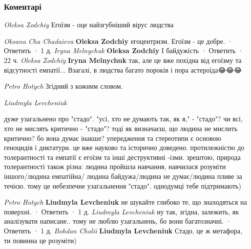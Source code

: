  
 
 
 
 
\subsubsection{Коментарі}

\begin{itemize}
\emph{Oleksa Zodchiy}
Егоїзм - оце найзгубніший вірус людства

\begin{itemize}
\emph{Oksana Cha Chadaieva}
\textbf{Oleksa Zodchiy} егоцентризм. Егоїзм - це добре.
 · Ответить · 1 д.
\emph{Iryna Melnychuk}
\textbf{Oleksa Zodchiy}
І байдужість
 · Ответить · 22 ч.
\emph{Oleksa Zodchiy}
\textbf{Iryna Melnychuk} так, але це вже похідна від егоїзму та відсутності емпатії... Взагалі, в людства багато пороків і пора астероїда😂😂😂
\end{itemize}

\emph{Petro Hotych}
Згідний з кожним словом.

\emph{Liudmyla Levcheniuk}

дуже узагальнено про "стадо". "усі, хто не думають так, як я," - "стадо"? чи
всі, хто не мислять критично - "стадо"? тоді як визначаєш, що людина не мислить
критично? бо вона думає інакше? упередження та стереотипи є основою геноцидів і
диктатури. це вже науково та історично доведено. протилежністю до толерантності
та емпатії є егоїзм та інші деструктивні -ізми. зрештою, природа толерантності
також різна: людина пройшла навчання, навчилася розуміти іншого/людина
емпатійна/ людина байдужа/людина не думає/людина пливе за течією. тому це
небезпечне узагальнення "стадо". однодумці тебе підтримають)

\begin{itemize}
\emph{Petro Hotych}
\textbf{Liudmyla Levcheniuk} не шукайте глибоко те, що знаходяться на поверхні.
 · Ответить · 1 д.
\emph{Liudmyla Levcheniuk}
ну так, згідна, залежить, як аналізувати написане.. тому не люблю узагальнень, бо вони багатозначні.
 · Ответить · 1 д.
\emph{Bohdan Cholii}
\textbf{Liudmyla Levcheniuk} Стадо, це ж метафора, ти повинна це розуміти)
\end{itemize}


\end{itemize}
